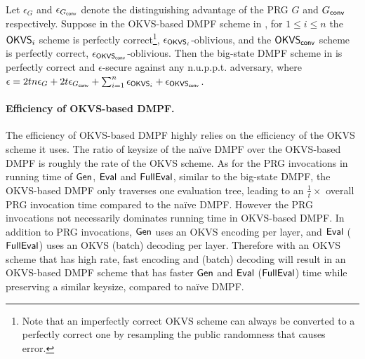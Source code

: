 \begin{theorem}
Let $\epsilon_G$ and $\epsilon_{G_{\sf conv}}$ denote the distinguishing advantage of the PRG $G$ and $G_{\sf conv}$ respectively. Suppose in the OKVS-based DMPF scheme in , for $1\le i\le n$ the ${\sf OKVS}_i$ scheme is perfectly correct\footnote[2]{Note that an imperfectly correct OKVS scheme can always be converted to a perfectly correct one by resampling the public randomness that causes error. },   $\epsilon_{{\sf OKVS}_i}$-oblivious, and the ${\sf OKVS}_{{\sf conv}}$ scheme is perfectly correct, $\epsilon_{{\sf OKVS}_{\sf conv}}$-oblivious. Then the big-state DMPF scheme in  is perfectly correct and $\epsilon$-secure against any n.u.p.p.t. adversary, where $\epsilon = 2tn\epsilon_G+2t\epsilon_{G_{\sf conv}} +\sum_{i=1}^n\epsilon_{{\sf OKVS}_i}+\epsilon_{{\sf OKVS}_{\sf conv}}$. 
\end{theorem}

\paragraph{Efficiency of OKVS-based DMPF.}The efficiency of OKVS-based DMPF highly relies on the efficiency of the OKVS scheme it uses. The ratio of keysize of the na\"ive DMPF over the OKVS-based DMPF is roughly the rate of the OKVS scheme. As for the PRG invocations in running time of ${\sf Gen}$, ${\sf Eval}$ and ${\sf FullEval}$, similar to the big-state DMPF, the OKVS-based DMPF only traverses one evaluation tree, leading to an $\frac{1}{t}\times $ overall PRG invocation time compared to the na\"ive DMPF. However the PRG invocations not necessarily dominates running time in OKVS-based DMPF. In addition to PRG invocations, ${\sf Gen}$ uses an OKVS encoding per layer, and ${\sf Eval}$ (${\sf FullEval}$) uses an OKVS (batch) decoding per layer. Therefore with an OKVS scheme that has high rate, fast encoding and (batch) decoding will result in an OKVS-based DMPF scheme that has faster ${\sf Gen}$ and ${\sf Eval}$ (${\sf FullEval}$) time while preserving a similar keysize, compared to na\"ive DMPF. 

